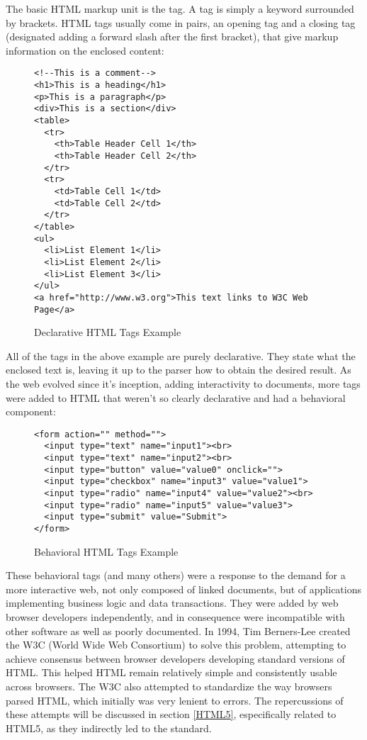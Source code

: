 The basic HTML markup unit is the tag. A tag is simply a keyword surrounded by brackets. HTML tags usually come in
pairs, an opening tag and a closing tag (designated adding a forward slash after the first bracket), that give markup
information on the enclosed content:
\begin{figure}[ht]
\begin{verbatim}
<!--This is a comment-->
<h1>This is a heading</h1>
<p>This is a paragraph</p>
<div>This is a section</div>
<table>
  <tr>
    <th>Table Header Cell 1</th>
    <th>Table Header Cell 2</th> 
  </tr>
  <tr>
    <td>Table Cell 1</td>
    <td>Table Cell 2</td> 
  </tr>
</table>
<ul>
  <li>List Element 1</li>
  <li>List Element 2</li>
  <li>List Element 3</li>
</ul>
<a href="http://www.w3.org">This text links to W3C Web Page</a>
\end{verbatim}
\caption{Declarative HTML Tags Example}
\end{figure}
All of the tags in the above example are purely declarative. They state what the enclosed text is, leaving it up to
the parser how to obtain the desired result. As the web evolved since it's inception, adding interactivity to
documents, more tags were added to HTML that weren't so clearly declarative and had a behavioral component:
\begin{figure}[ht]
\begin{verbatim}
<form action="" method="">
  <input type="text" name="input1"><br>
  <input type="text" name="input2"><br>
  <input type="button" value="value0" onclick="">
  <input type="checkbox" name="input3" value="value1">
  <input type="radio" name="input4" value="value2"><br>
  <input type="radio" name="input5" value="value3">
  <input type="submit" value="Submit">
</form>
\end{verbatim}
\caption{Behavioral HTML Tags Example}
\end{figure}
These behavioral tags (and many others) were a response to the demand for a more interactive web, not only composed of
linked documents, but of applications implementing business logic and data transactions. They were added by web
browser developers independently, and in consequence were incompatible with other software as well as poorly
documented. In 1994, Tim Berners-Lee created the W3C (World Wide Web Consortium) to solve this problem, attempting to
achieve consensus between browser developers developing standard versions of HTML. This helped HTML remain relatively
simple and consistently usable across browsers. The W3C also attempted to standardize the way browsers parsed HTML,
which initially was very lenient to errors. The repercussions of these attempts will be discussed in section
\ref{HTML5}, especifically related to HTML5, as they indirectly led to the standard.\\

